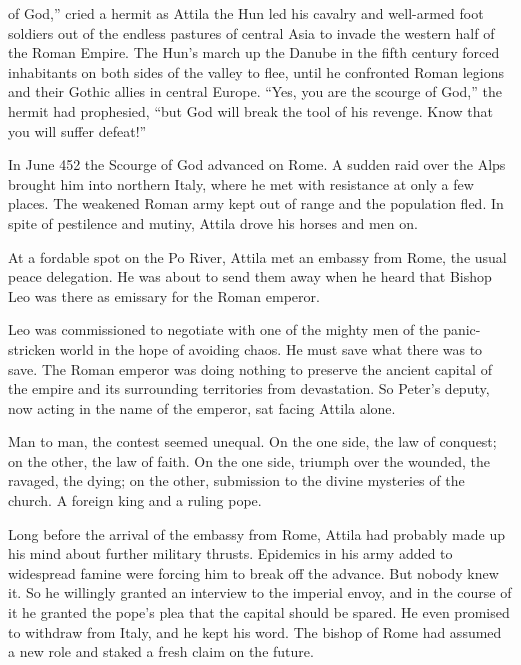 
 of God,” cried a hermit as Attila the Hun led his cavalry and
well-armed foot soldiers out of the endless pastures of central Asia to invade the western half of
the Roman Empire. The Hun’s march up the Danube in the fifth century forced inhabitants on both
sides of the valley to flee, until he confronted Roman legions and their Gothic allies in central
Europe. “Yes, you are the scourge of God,” the hermit had prophesied, “but God will break the tool
of his revenge. Know that you will suffer defeat!”

In June 452 the Scourge of God advanced on Rome. A sudden raid over the Alps brought him into
northern Italy, where he met with resistance at only a few places. The weakened Roman army kept out
of range and the population fled. In spite of pestilence and mutiny, Attila drove his horses and men
on.

At a fordable spot on the Po River, Attila met an embassy from Rome, the usual peace delegation. He
was about to send them away when he heard that Bishop Leo was there as emissary for the Roman
emperor.

Leo was commissioned to negotiate with one of the mighty men of the panic-stricken world in the hope
of avoiding chaos. He must save what there was to save. The Roman emperor was doing nothing to
preserve the ancient capital of the empire and its surrounding territories from devastation. So
Peter’s deputy, now acting in the name of the emperor, sat facing Attila alone.

Man to man, the contest seemed unequal. On the one side, the law of conquest; on the other, the law
of faith. On the one side, triumph over the wounded, the ravaged, the dying; on the other,
submission to the divine mysteries of the church. A foreign king and a ruling pope.

Long before the arrival of the embassy from Rome, Attila had probably made up his mind about further
military thrusts. Epidemics in his army added to widespread famine were forcing him to break off the
advance. But nobody knew it. So he willingly granted an interview to the imperial envoy, and in the
course of it he granted the pope’s plea that the capital should be spared. He even promised to
withdraw from Italy, and he kept his word. The bishop of Rome had assumed a new role and staked a
fresh claim on the future.

